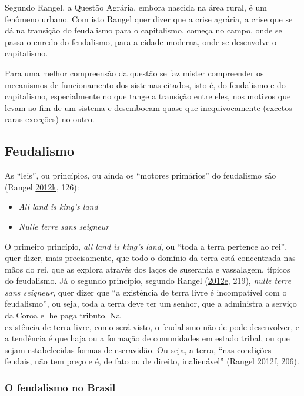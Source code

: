 \documentclass[
	12pt,				%
	oneside,			%
	a4paper,			%
	chapter=TITLE,		%
	section=TITLE,		%
	english,			%
	brazil				%
	]{abntex2}
\begin{document}
Segundo Rangel, a Questão Agrária, embora nascida na área rural, é um fenômeno
urbano. Com isto Rangel quer dizer que a crise agrária, a crise que se dá na
transição do feudalismo para o capitalismo, começa no campo, onde se passa o
enredo do feudalismo, para a cidade moderna, onde se desenvolve o capitalismo.

Para uma melhor compreensão da questão se faz mister compreender os mecanismos
de funcionamento dos sistemas citados, isto é, do feudalismo e do capitalismo,
especialmente no que tange a transição entre eles, nos motivos que levam ao
fim de um sistema e desembocam quase que inequivocamente (excetos raras
exceções) no outro.

\hypertarget{feudalismo}{%
\subsection{Feudalismo}\label{feudalismo}}

As ``leis'', ou princípios, ou ainda os ``motores primários'' do feudalismo são
(Rangel \protect\hyperlink{ref-rangel1985}{2012}\protect\hyperlink{ref-rangel1985}{k}, 126):
\begin{itemize}
\tightlist
\item
  \emph{All land is king's land}
\item
  \emph{Nulle terre sans seigneur}
\end{itemize}
O primeiro princípio, \emph{all land is king's land}, ou ``toda a terra pertence ao
rei'', quer dizer, mais precisamente, que todo o domínio da terra está
concentrada nas mãos do rei, que as explora através dos laços de suserania e
vassalagem, típicos do feudalismo. Já o segundo princípio, segundo Rangel
(\protect\hyperlink{ref-rangel1961}{2012}\protect\hyperlink{ref-rangel1961}{e}, 219), \emph{nulle terre sans seigneur}, quer dizer que ``a existência
de terra livre é incompatível com o feudalismo'', ou seja, toda a terra deve
ter um senhor, que a administra a serviço da Coroa e lhe paga tributo. Na\\
existência de terra livre, como será visto, o feudalismo não de pode desenvolver,
e a tendência é que haja ou a formação de comunidades em estado tribal, ou que
sejam estabelecidas formas de escravidão. Ou seja, a terra, ``nas condições
feudais, não tem preço e é, de fato ou de direito, inalienável'' (Rangel \protect\hyperlink{ref-rangel1960}{2012}\protect\hyperlink{ref-rangel1960}{f}, 206).

\hypertarget{o-feudalismo-no-brasil}{%
\subsubsection{O feudalismo no Brasil}\label{o-feudalismo-no-brasil}}
\end{document}
